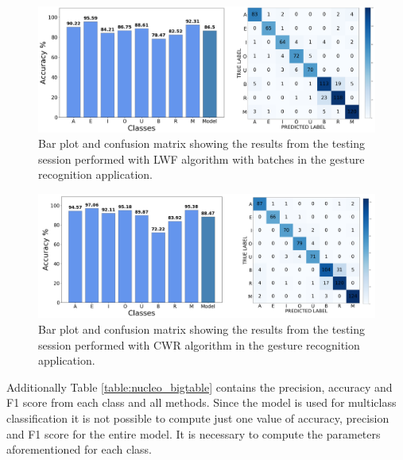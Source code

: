 \documentclass[12pt]{report}
\begin{document}
\begin{figure}[h!]
    \centering
    \includegraphics[width=140mm]{Figures/Chapter5/STM_barPlot_LWF_batch.png} 
    \caption{Bar plot and confusion matrix showing the results from the testing session performed with LWF algorithm with batches in the gesture recognition application.}
    \label{fig:letter_res_LWF_batch}    
\end{figure}

\begin{figure}[h!]
    \centering
    \includegraphics[width=140mm]{Figures/Chapter5/STM_barPlot_CWR.png} 
    \caption{Bar plot and confusion matrix showing the results from the testing session performed with CWR algorithm in the gesture recognition application.}
    \label{fig:letter_res_CWR}    
\end{figure}

Additionally Table \ref{table:nucleo_bigtable} contains the precision, accuracy and F1 score from each class and all methods. Since the model is used for multiclass classification it is not possible to compute just one value of accuracy, precision and F1 score for the entire model. It is necessary to compute the parameters aforementioned for each class.
\end{document}
